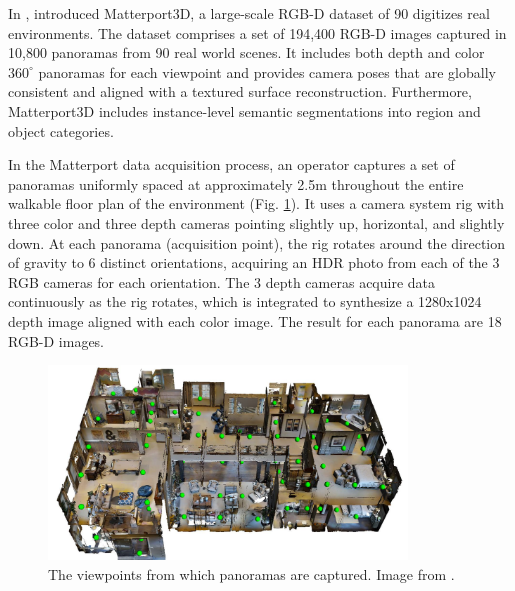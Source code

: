 In \citeyear{matterport}, \citeauthor{matterport} introduced Matterport3D, a large-scale RGB-D dataset of 90 digitizes real environments. The dataset comprises a set of 194,400 RGB-D images captured in 10,800 panoramas from 90 real world scenes. It includes both depth and color $360^{\circ} $ panoramas for each viewpoint and provides camera poses that are globally consistent and aligned with a textured surface reconstruction. Furthermore, Matterport3D includes instance-level semantic segmentations into region and object categories.

In the Matterport data acquisition process, an operator captures
a set of panoramas uniformly spaced at approximately 2.5m
throughout the entire walkable floor plan of the environment (Fig. \ref{fig:matterport-panoramas}). It uses a camera system rig with three color and three depth cameras pointing slightly up, horizontal, and slightly down. At each panorama (acquisition point), the rig rotates around the direction of gravity to
6 distinct orientations, acquiring an HDR photo from each of the 3 RGB cameras for each orientation. The 3 depth cameras acquire data continuously as the rig rotates, which is integrated to synthesize a 1280x1024 depth image aligned
with each color image. The result for each panorama are 18 RGB-D images. 

\begin{figure}[h!]
	\centering
	\includegraphics[width=0.85\textwidth]{images/panoramas.pdf}
	\caption{The viewpoints from which panoramas are captured. Image from \cite{matterport}.}
	\label{fig:matterport-panoramas}
\end{figure}

